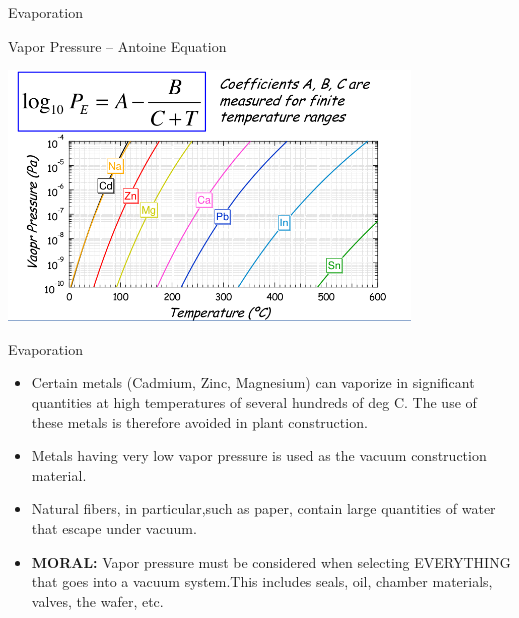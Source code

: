 \documentclass[11]{beamer}
\begin{document}
\begin{frame}{Evaporation}

\begin{exampleblock}{Vapor Pressure – Antoine Equation}
       \begin{center}
			\includegraphics[width=0.8\textwidth]{VaporPrEqn.png}
		\end{center}


\end{exampleblock}

\end{frame}

\begin{frame}{Evaporation}

	\begin{exampleblock}
		
		\begin{itemize}

			\item Certain metals (Cadmium, Zinc, Magnesium) can vaporize in significant quantities at high temperatures of several hundreds of deg C. The use of these metals is therefore avoided in plant construction.
			\item Metals having very low vapor pressure is used as the vacuum construction material.
			\item Natural fibers, in particular,such as paper, contain large quantities of water that escape under vacuum.
			\item \textbf{MORAL:} Vapor pressure must be considered when selecting EVERYTHING that goes into a vacuum system.This includes seals, oil, chamber materials, valves, the wafer, etc.

  		  \end{itemize}

\end{exampleblock}

\end{frame}
\end{document}
